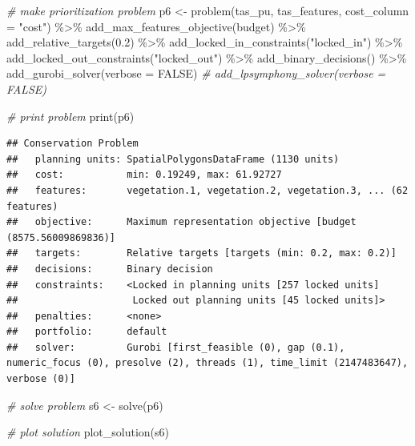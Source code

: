 \documentclass[
  12pt,
]{book}
\newenvironment{Shaded}{\begin{snugshade}}{\end{snugshade}}
\newcommand{\AttributeTok}[1]{\textcolor[rgb]{0.77,0.63,0.00}{#1}}
\newcommand{\CommentTok}[1]{\textcolor[rgb]{0.56,0.35,0.01}{\textit{#1}}}
\newcommand{\ConstantTok}[1]{\textcolor[rgb]{0.00,0.00,0.00}{#1}}
\newcommand{\FloatTok}[1]{\textcolor[rgb]{0.00,0.00,0.81}{#1}}
\newcommand{\FunctionTok}[1]{\textcolor[rgb]{0.00,0.00,0.00}{#1}}
\newcommand{\NormalTok}[1]{#1}
\newcommand{\OtherTok}[1]{\textcolor[rgb]{0.56,0.35,0.01}{#1}}
\newcommand{\SpecialCharTok}[1]{\textcolor[rgb]{0.00,0.00,0.00}{#1}}
\newcommand{\StringTok}[1]{\textcolor[rgb]{0.31,0.60,0.02}{#1}}
\begin{document}
\begin{Shaded}
\begin{Highlighting}[]
\CommentTok{\# make prioritization problem}
\NormalTok{p6 }\OtherTok{\textless{}{-}} \FunctionTok{problem}\NormalTok{(tas\_pu, tas\_features, }\AttributeTok{cost\_column =} \StringTok{"cost"}\NormalTok{) }\SpecialCharTok{\%\textgreater{}\%}
      \FunctionTok{add\_max\_features\_objective}\NormalTok{(budget) }\SpecialCharTok{\%\textgreater{}\%}
      \FunctionTok{add\_relative\_targets}\NormalTok{(}\FloatTok{0.2}\NormalTok{) }\SpecialCharTok{\%\textgreater{}\%}
      \FunctionTok{add\_locked\_in\_constraints}\NormalTok{(}\StringTok{"locked\_in"}\NormalTok{) }\SpecialCharTok{\%\textgreater{}\%}
      \FunctionTok{add\_locked\_out\_constraints}\NormalTok{(}\StringTok{"locked\_out"}\NormalTok{) }\SpecialCharTok{\%\textgreater{}\%}
      \FunctionTok{add\_binary\_decisions}\NormalTok{() }\SpecialCharTok{\%\textgreater{}\%}
      \FunctionTok{add\_gurobi\_solver}\NormalTok{(}\AttributeTok{verbose =} \ConstantTok{FALSE}\NormalTok{)}
      \CommentTok{\# add\_lpsymphony\_solver(verbose = FALSE)}

\CommentTok{\# print problem}
\FunctionTok{print}\NormalTok{(p6)}
\end{Highlighting}
\end{Shaded}

\begin{verbatim}
## Conservation Problem
##   planning units: SpatialPolygonsDataFrame (1130 units)
##   cost:           min: 0.19249, max: 61.92727
##   features:       vegetation.1, vegetation.2, vegetation.3, ... (62 features)
##   objective:      Maximum representation objective [budget (8575.56009869836)]
##   targets:        Relative targets [targets (min: 0.2, max: 0.2)]
##   decisions:      Binary decision 
##   constraints:    <Locked in planning units [257 locked units]
##                    Locked out planning units [45 locked units]>
##   penalties:      <none>
##   portfolio:      default
##   solver:         Gurobi [first_feasible (0), gap (0.1), numeric_focus (0), presolve (2), threads (1), time_limit (2147483647), verbose (0)]
\end{verbatim}

\begin{Shaded}
\begin{Highlighting}[]
\CommentTok{\# solve problem}
\NormalTok{s6 }\OtherTok{\textless{}{-}} \FunctionTok{solve}\NormalTok{(p6)}

\CommentTok{\# plot solution}
\FunctionTok{plot\_solution}\NormalTok{(s6)}
\end{Highlighting}
\end{Shaded}
\end{document}
